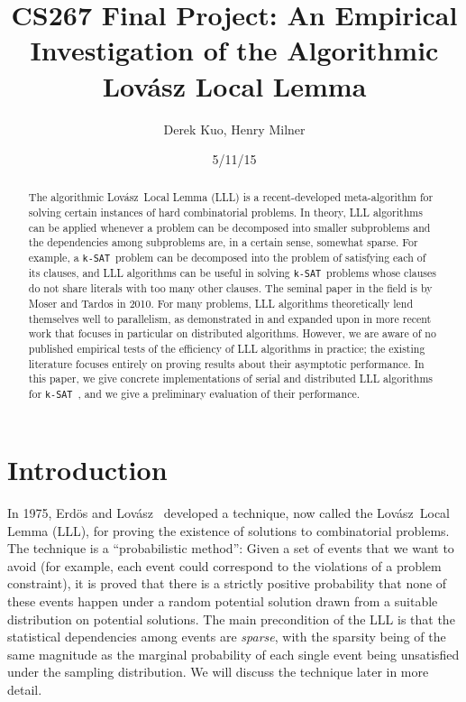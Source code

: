 \documentclass[twocolumn]{article}
\author{Derek Kuo, Henry Milner}
\title{CS267 Final Project: An Empirical Investigation of the Algorithmic Lovász Local Lemma}
\date{5/11/15}
\newcommand{\ksat}{\texttt{k-SAT}~}
\newcommand{\lovasz}{Lov\'{a}sz~}
\begin{document}
\maketitle

\begin{abstract}
The algorithmic \lovasz Local Lemma (LLL) is a recent-developed meta-algorithm for solving certain instances of hard combinatorial problems.  In theory, LLL algorithms can be applied whenever a problem can be decomposed into smaller subproblems and the dependencies among subproblems are, in a certain sense, somewhat sparse.  For example, a \ksat problem can be decomposed into the problem of satisfying each of its clauses, and LLL algorithms can be useful in solving \ksat problems whose clauses do not share literals with too many other clauses.  The seminal paper in the field is by Moser and Tardos \cite{moser2010constructive} in 2010.  For many problems, LLL algorithms theoretically lend themselves well to parallelism, as demonstrated in \cite{moser2010constructive} and expanded upon in more recent work \cite{chung2014distributed,haeupler2011new} that focuses in particular on distributed algorithms.  However, we are aware of no published empirical tests of the efficiency of LLL algorithms in practice; the existing literature focuses entirely on proving results about their asymptotic performance.  In this paper, we give concrete implementations of serial and distributed LLL algorithms for \ksat, and we give a preliminary evaluation of their performance.
\end{abstract}

\section{Introduction}
\label{sec:intro}
In 1975, Erd\"{o}s and \lovasz \cite{erdos1975problems} developed a technique, now called the \lovasz Local Lemma (LLL), for proving the existence of solutions to combinatorial problems.  The technique is a ``probabilistic method'': Given a set of events that we want to avoid (for example, each event could correspond to the violations of a problem constraint), it is proved that there is a strictly positive probability that none of these events happen under a random potential solution drawn from a suitable distribution on potential solutions.  The main precondition of the LLL is that the statistical dependencies among events are \emph{sparse}, with the sparsity being of the same magnitude as the marginal probability of each single event being unsatisfied under the sampling distribution.  We will discuss the technique later in more detail.
\end{document}
